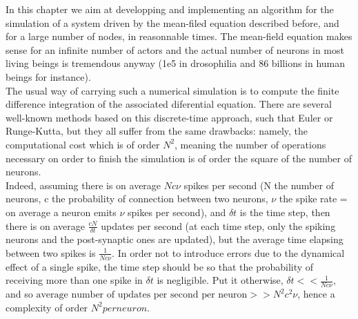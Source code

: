 	In this chapter we aim at developping and implementing an algorithm for the simulation of a system driven by the mean-filed equation described before, and for a large number of nodes, in reasonnable times. The mean-field equation makes sense for an infinite number of actors and the actual number of neurons in most living beings is tremendous anyway (1e5 in drosophilia and 86 billions in human beings for instance).\\
	The usual way of carrying such a numerical simulation is to compute the finite difference integration of the associated diferential equation. There are several well-known methods based on this discrete-time approach, such that Euler or Runge-Kutta, but they all suffer from the same drawbacks: namely, the computational cost which is of order $N^2$, meaning the number of operations necessary on order to finish the simulation is of order the square of the number of neurons.\\
	Indeed, assuming there is on average $Nc\nu$ spikes per second (N the number of neurons, c the probability of connection between two neurons, $\nu$ the spike rate = on average a neuron emits $\nu$ spikes per second), and $\delta t$ is the time step, then there is on average $\frac{cN}{\delta t}$ updates per second (at each time step, only the spiking neurons and the post-synaptic ones are updated), but the average time elapsing between two spikes is $\frac{1}{Nc\nu}$. In order not to introduce errors due to the dynamical effect of a single spike, the time step should be so that the probability of receiving more than one spike in $\delta t$ is negligible. Put it otherwise, $\delta t<<\frac{1}{Nc\nu}$, and so $\text{average number of updates per second per neuron}>>N^2c^2\nu$, hence a complexity of order $N^2 per neuron$.\\

